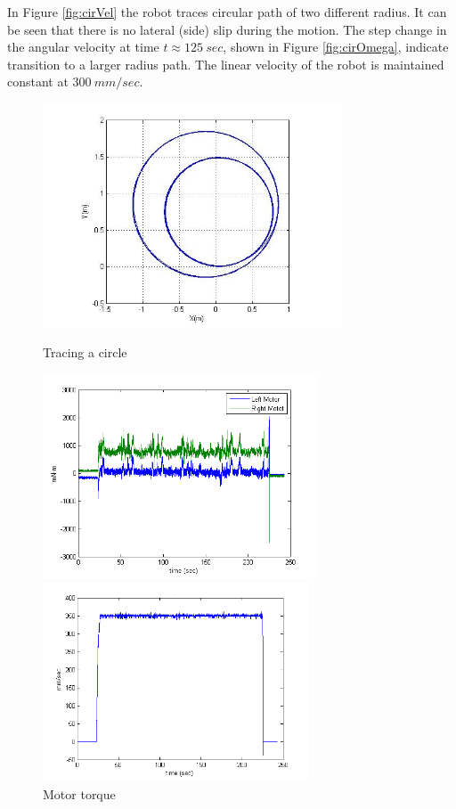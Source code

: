 In Figure \ref{fig:cirVel} the robot traces circular path of two different radius. It can be seen that there is no lateral (side) slip during the motion. The step change in the angular velocity at time $ t\approx125~sec$, shown in Figure \ref{fig:cirOmega}, indicate transition to a larger radius path. The linear velocity of the robot is maintained constant at $ 300~mm/sec$.
\begin{figure}
	\begin{minipage}[t]{0.5\textwidth}
		\centering
		\includegraphics[width=3.5in]{Chapter5/fig/CircleOdo} 
		\caption{Tracing a circle}\label{fig:circle}
	\end{minipage}
	\hfill
	\begin{minipage}[t]{0.5\textwidth}
		\centering
		\includegraphics[width=3.2in]{Chapter5/fig/cirTorq} 
		\caption{Motor torque}\label{fig:cirTorq}
	\end{minipage}
\vfill 
\begin{minipage}[t]{0.5\textwidth}
	\centering
	\includegraphics[width=3.1in]{Chapter5/fig/cirVel} 

\end{minipage}
\end{figure}
